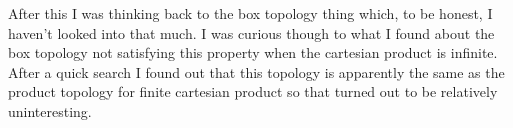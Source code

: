 After this I was thinking back to the box topology thing which, 
to be honest, I haven't looked into that much. I was curious though 
to what I found about the box topology not satisfying this property 
when the cartesian product is infinite. After a quick search I found 
out that this topology is apparently the same as the product topology 
for finite cartesian product so that turned out to be relatively 
uninteresting. 



